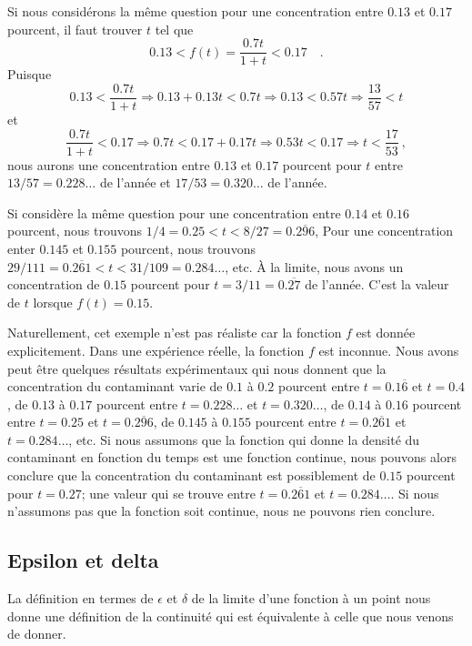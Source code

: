 {\begin{egg}[\life]
Si nous considérons la même question pour une concentration entre $0.13$
et $0.17$ pourcent, il faut trouver $t$ tel que
\[
  0.13 < f(t) = \frac{0.7t}{1+t} < 0.17 \quad .
\]
Puisque
\[
  0.13 < \frac{0.7t}{1+t} \Rightarrow 0.13 + 0.13 t < 0.7 t
  \Rightarrow 0.13 < 0.57 t \Rightarrow \frac{13}{57} < t
\]
et
\[
  \frac{0.7t}{1+t} < 0.17 \Rightarrow 0.7 t < 0.17 + 0.17 t
  \Rightarrow 0.53 t < 0.17 \Rightarrow t < \frac{17}{53} \ ,
\]
nous aurons une concentration entre $0.13$ et $0.17$ pourcent pour $t$
entre $13/57 =0.228\ldots$ de l'année et $17/53 = 0.320\ldots$ de l'année.

Si considère la même question pour une concentration entre $0.14$
et $0.16$ pourcent, nous trouvons $1/4 = 0.25 < t < 8/27 = 0.\overline{296}$,
Pour une concentration enter $0.145$ et $0.155$ pourcent, nous trouvons
$29/111 = 0.\overline{261} < t < 31/109 = 0.284\ldots$, etc.  À la
limite, nous avons un concentration de $0.15$ pourcent pour
$t = 3/11 = 0.\overline{27}$ de l'année.   C'est la valeur de $t$
lorsque $f(t) = 0.15$.

Naturellement, cet exemple n'est pas réaliste car la fonction $f$ est
donnée explicitement.  Dans une expérience réelle, la fonction $f$ est
inconnue.  Nous avons peut être quelques résultats expérimentaux 
qui nous donnent que la concentration du contaminant varie de $0.1$ à
$0.2$ pourcent entre $t=0.1\overline{6}$ et $t = 0.4$, de $0.13$ à
$0.17$ pourcent entre $t =0.228\ldots$ et $t = 0.320\ldots$, 
de $0.14$ à $0.16$ pourcent entre $t = 0.25$ et $t = 0.\overline{296}$,
de $0.145$ à $0.155$ pourcent entre $t = 0.\overline{261}$ et
$t = 0.284\ldots$, etc.  Si nous assumons que la fonction qui donne la
densité du contaminant en fonction du temps est une fonction continue,
nous pouvons alors conclure que la concentration du contaminant est
possiblement de $0.15$ pourcent pour $t=0.27$; une valeur qui se
trouve entre $t = 0.\overline{261}$ et $t = 0.284\ldots$.  Si nous
n'assumons pas que la fonction soit continue, nous ne pouvons rien
conclure.
\end{egg}

\subsection{Epsilon et delta \theory}

La définition en termes de $\epsilon$ et $\delta$ de la limite d'une
fonction à un point nous donne une définition de la continuité qui est
équivalente à celle que nous venons de donner.

}
